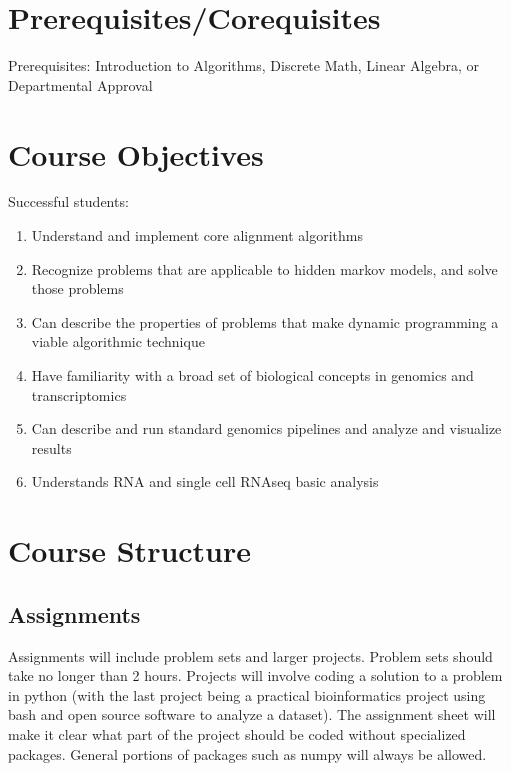 \documentclass[11pt]{article}
\begin{document}

\section*{Prerequisites/Corequisites}
Prerequisites: Introduction to Algorithms, Discrete Math, Linear Algebra, or Departmental Approval


\section*{Course Objectives}
Successful students:
\begin{enumerate}
\item Understand and implement core alignment algorithms
\item Recognize problems that are applicable to hidden markov models, and solve those problems
\item Can describe the properties of problems that make dynamic programming a viable algorithmic technique
\item Have familiarity with a broad set of biological concepts in genomics and transcriptomics
\item Can describe and run standard genomics pipelines and analyze and visualize results
\item Understands RNA and single cell RNAseq basic analysis
\end{enumerate}


\section*{Course Structure}

\subsection*{Assignments}
Assignments will include problem sets and larger projects. Problem sets should take no longer than 2 hours. Projects will involve coding a solution to a problem in python (with the last project being a practical bioinformatics project using bash and open source software to analyze a dataset). The assignment sheet will make it clear what part of the project should be coded without specialized packages. General portions of packages such as numpy will always be allowed.
\end{document}
